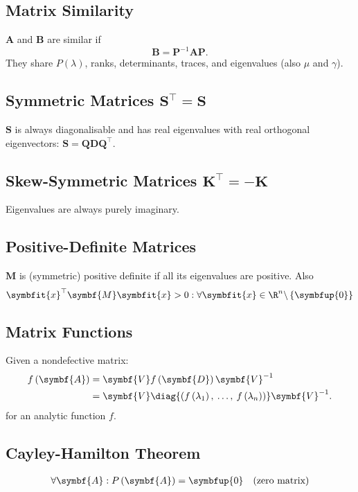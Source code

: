 \documentclass{article}
\begin{document}
\begin{multicols*}{3}
    \subsection{Matrix Similarity}
    \(\symbf{A}\) and \(\symbf{B}\) are similar if
    \begin{equation*}
        \symbf{B} = \symbf{P}^{-1} \symbf{A} \symbf{P}.
    \end{equation*}
    They share \(P(\lambda)\), ranks, determinants, traces, and eigenvalues (also \(\mu\) and \(\gamma\)).
    \subsection{Symmetric Matrices \texorpdfstring{\(\symbf{S}^\top = \symbf{S}\)}{S' = S}}
    \(\symbf{S}\) is always diagonalisable and has
    real eigenvalues with real orthogonal eigenvectors: \(\symbf{S} = \symbf{Q} \symbf{D} \symbf{Q}^\top\).
    \subsection{Skew-Symmetric Matrices \texorpdfstring{\(\symbf{K}^\top = -\symbf{K}\)}{K' = -K}}
    Eigenvalues are always purely imaginary.
    \subsection{Positive-Definite Matrices}
    \(\symbf{M}\) is (symmetric) positive definite if all its eigenvalues are positive. Also
    \begin{equation*}
        \symbfit{x}^\top \symbf{M} \symbfit{x} > 0 : \forall \symbfit{x} \in \R^n \backslash \left\{ \symbfup{0} \right\}
    \end{equation*}
    \subsection{Matrix Functions}
    Given a nondefective matrix:
    \begin{align*}
        f\left( \symbf{A} \right) & = \symbf{V} f\left( \symbf{D} \right) \symbf{V}^{-1}                                                               \\
                                  & = \symbf{V} \diag{\left( f\left( \lambda_1 \right),\: \ldots,\: f\left( \lambda_n \right) \right)} \symbf{V}^{-1}.
    \end{align*}
    for an analytic function \(f\).
    \subsection{Cayley-Hamilton Theorem}
    \begin{align*}
        \forall \symbf{A} : P\left( \symbf{A} \right) = \symbfup{0} &  & \text{(zero matrix)}
    \end{align*}

\end{multicols*}
\end{document}
